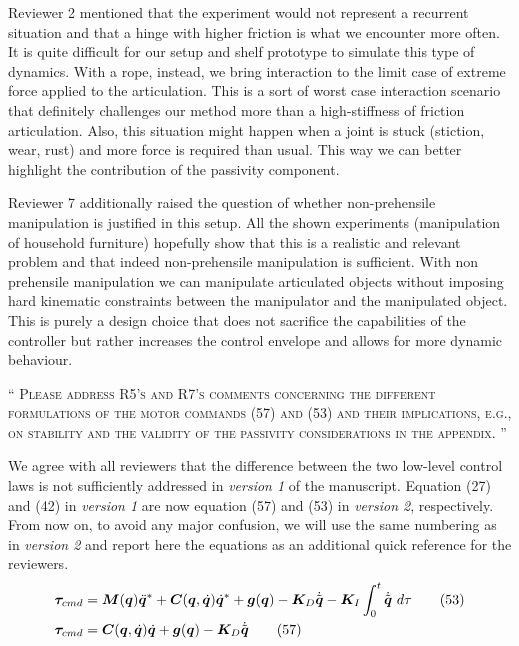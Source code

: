 \documentclass[10pt]{article}
\newcommand{\referee}[1]{\;
  \begin{minipage}[t]{.95\textwidth}
    ``{\small\color{red} \textsc{#1}}''
  \end{minipage}\medskip
  }
\newcommand{\version}[1]{\textit{version #1}}
\begin{document}
\begin{enumerate}[label={[E:\,\arabic{enumi}]}]

Reviewer 2 mentioned that the experiment would not represent a recurrent situation and that a hinge with higher friction is what we encounter more often. It is quite difficult for our setup and shelf prototype to simulate this type of dynamics. With a rope, instead, we bring interaction to the limit case of extreme force applied to the articulation. This is a sort of worst case interaction scenario that definitely challenges our method more than a high-stiffness of friction articulation. Also, this situation might happen when a joint is stuck (stiction, wear, rust) and more force is required than usual. This way we can better highlight the contribution of the passivity component. 


Reviewer 7 additionally raised the question of whether non-prehensile manipulation is justified in this setup. All the shown experiments (manipulation of household furniture) hopefully show that this is a realistic and relevant problem and that indeed non-prehensile manipulation is sufficient. With non prehensile manipulation we can manipulate articulated objects without imposing hard kinematic constraints between the manipulator and the manipulated object. This is purely a design choice that does not sacrifice the capabilities of the controller but rather increases the control envelope and allows for more dynamic behaviour.

\item\label{reply:E1:5} \label{reply:ext:equations}
\referee{Please address R5’s and R7’s comments concerning the different formulations of the motor commands (57) and (53) and their implications, e.g., on stability and the validity of the passivity
considerations in the appendix.
}

We agree with all reviewers that the difference between the two low-level control laws is not sufficiently addressed in \version{1} of the manuscript. Equation (27) and (42) in \version{1} are now equation (57) and (53) in \version{2}, respectively. From now on, to avoid any major confusion, we will use the same numbering as in \version{2} and report here the equations as an additional quick reference for the reviewers. 
\begin{align*}
    \boldsymbol{\tau}_{cmd} &= \bm{M}(\bm{q}) \ddot{\bm{q}}^* + \bm{C}(\bm{q}, \dot{\bm{q}}) \dot{\bm{q}}^* + \bm{g}(\bm{q}) - \bm{K}_D \dot{\tilde{\bm{q}}} - \bm{K}_I \int_{0}^{t} \dot{\tilde{\bm{q}}}\ d\tau \tag{53} \label{reply:eq:tau_rob} \\
\boldsymbol{\tau}_{cmd} &= \bm{C}(\bm{q}, \dot{\bm{q}}) \dot{\bm{q}} + \bm{g}(\bm{q}) - \bm{K}_{D} \dot{\tilde{\bm{q}}} \label{reply:eq:tau_sim} \tag{57}
\end{align*}


\end{enumerate}
\end{document}
